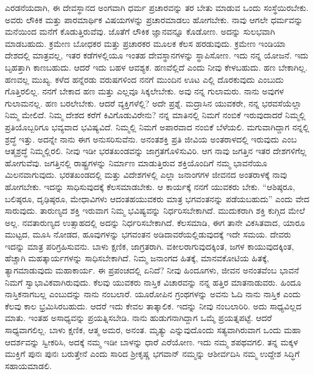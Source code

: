 ಎರಡನೆಯದಾಗಿ, ಈ ದೇವಸ್ಥಾನದ ಅಂಗವಾಗಿ ಧರ್ಮ ಪ್ರಚಾರವನ್ನು ತರ ಬೇತು ಮಾಡುವ ಒಂದು ಸಂಸ್ಥೆಯಿರಬೇಕು. ಅವರು ಲೌಕಿಕ ಮತ್ತು ಪಾರಮಾರ್ಥಿಕ ವಿಷಯಗಳನ್ನು ಪ್ರಚಾರಮಾಡಲು ಹೋಗಬೇಕು. ನಾವು ಆಗಲೇ ಧರ್ಮವನ್ನು ಮನೆಯಿಂದ ಮನೆಗೆ ಕೊಡುತ್ತಿರುವೆವು. ಜೊತೆಗೆ ಲೌಕಿಕ ಜ್ಞಾನವನ್ನೂ ಕೊಡೋಣ. ಅದನ್ನು ಸುಲಭವಾಗಿ ಮಾಡಬಹುದು. ಕ್ರಮೇಣ ಬೋಧಕರ ಮತ್ತು ಪ್ರಚಾರಕರ ಮೂಲಕ ಕೆಲಸ ಹರಡುವುದು. ಕ್ರಮೇಣ ಇಂಡಿಯಾ ದೇಶದಲ್ಲಿ ಮಾತ್ರವಲ್ಲ, ಇತರ ಕಡೆಗಳಲ್ಲಿಯೂ ಇಂತಹ ದೇವಸ್ಥಾನಗಳನ್ನು ಸ್ಥಾಪಿಸೋಣ. ಇದು ನನ್ನ ಯೋಜನೆ. ಇದು ಬೃಹತ್ತಾಗಿ ಕಾಣಬಹುದು. ಆದರೆ ಇದು ಬಹಳ ಆವಶ್ಯಕ. ಹಣವೆಲ್ಲಿದೆ ಎಂದು ನೀವು ಕೇಳಬಹುದು. ಹಣ ಬೇಕಾಗಿಲ್ಲ. ಹಣವಲ್ಲ ಮುಖ್ಯ. ಕಳೆದ ಹನ್ನೆರಡು ವರುಷಗಳಿಂದ ನನಗೆ ಮುಂದಿನ ಊಟ ಎಲ್ಲಿ ದೊರಕುವುದು ಎಂಬುದು ಗೊತ್ತಿರಲಿಲ್ಲ. ನನಗೆ ಬೇಕಾದ ಹಣ ಮತ್ತು ಎಲ್ಲವೂ ಸಿಕ್ಕಲೇಬೇಕು. ಅವು ನನ್ನ ಗುಲಾಮರು. ನಾನು ಅವುಗಳ ಗುಲಾಮನಲ್ಲ. ಹಣ ಬರಲೇಬೇಕು. ಆದರೆ ವ್ಯಕ್ತಿಗಳೆಲ್ಲಿ? ಅದೇ ಪ್ರಶ್ನೆ. ಮದ್ರಾಸಿನ ಯುವಕರೇ, ನನ್ನ ಭರವಸೆಯೆಲ್ಲಾ ನಿಮ್ಮ ಮೇಲಿದೆ. ನಿಮ್ಮ ದೇಶದ ಕರೆಗೆ ಕಿವಿಗೊಡುವಿರೇನು? ನನ್ನ ಮಾತಿನಲ್ಲಿ ನಿಮಗೆ ನಂಬಿಕೆ ಇರುವುದಾದರೆ ನಿಮ್ಮಲ್ಲಿ ಪ್ರತಿಯೊಬ್ಬರಿಗೂ ಭವ್ಯವಾದ ಭವಿಷ್ಯವಿದೆ. ನಿಮ್ಮಲ್ಲಿ ನಿಮಗೆ ಅಪಾರವಾದ ನಂಬಿಕೆ ಬೆಳೆಯಲಿ. ಮಗುವಾಗಿದ್ದಾಗ ನನ್ನಲ್ಲಿ ಶ್ರದ್ಧೆ ಇತ್ತು. ಅದನ್ನೇ ನಾನು ಈಗ ಅನುಸರಿಸುವೆನು. ಅನಂತಶಕ್ತಿ ಪ್ರತಿ ಜೀವಿಯ ಅಂತರಾಳದಲ್ಲಿ ಇರುವುದು ಎಂಬ ಆತ್ಮಶ್ರದ್ಧೆ ನಿಮ್ಮಲ್ಲಿರಲಿ. ನೀವು ಇಡೀ ಭರತಖಂಡವನ್ನು ಜಾಗ್ರತಗೊಳಿಸುವಿರಿ. ಆಗ ನಾವು ಜಗತ್ತಿನ ಇತರ ದೇಶಗಳಿಗೆಲ್ಲ ಹೋಗುವೆವು. ಜಗತ್ತಿನಲ್ಲಿ ರಾಷ್ಟ್ರಗಳನ್ನು ನಿರ್ಮಾಣ ಮಾಡುತ್ತಿರುವ ಶಕ್ತಿಯೊಂದಿಗೆ ನಮ್ಮ ಭಾವನೆಯೂ ಮಿಲನವಾಗುವುದು. ಭರತಖಂಡದಲ್ಲಿ ಮತ್ತು ವಿದೇಶಗಳಲ್ಲಿ ಎಲ್ಲಾ ಜನಾಂಗಗಳ ಜೀವನದ ಅಂತರಾಳಕ್ಕೆ ನಾವು ಹೋಗಬೇಕು. ಇದನ್ನು ಸಾಧಿಸುವುದಕ್ಕೆ ಕೆಲಸಮಾಡಬೇಕು. ಆ ಕಾರ್ಯಕ್ಕೆ ನನಗೆ ಯುವಕರು ಬೇಕು. “ಆಶಿಷ್ಠರೂ, ಬಲಿಷ್ಠರೂ, ದೃಢಿಷ್ಠರೂ, ಮೇಧಾವಿಗಳು ಆದಂತಹಯುವಕರು ಮಾತ್ರ ಭಗವಂತನನ್ನು ಪಡೆಯಬಹುದು” ಎಂದು ವೇದ ಸಾರುವುದು. ತಾರುಣ್ಯದ ಶಕ್ತಿ ಇರುವಾಗ ನಿಮ್ಮ ಭವಿಷ್ಯವನ್ನು ನಿರ್ಧರಿಸಬೇಕಾಗಿದೆ. ಮುದುಕರಾಗಿ ಶಕ್ತಿ ಕುಗ್ಗಿದ ಮೇಲೆ ಅಲ್ಲ. ನವತಾರುಣ್ಯದ ಉತ್ಸಾಹದಲ್ಲಿ ಅದನ್ನು ನಿರ್ಧರಿಸಬೇಕಾಗಿದೆ. ಕೆಲಸಮಾಡಿ, ಈಗ ತಾನೇ ವಿಕಸಿತವಾದ, ಯಾರೂ ಮುಟ್ಟದ, ಮೂಸಿ ನೋಡದ, ಹೂವುಗಳನ್ನು ಭಗವಂತನ ಅಡಿದಾವರೆಯಲ್ಲಿಡುವುದಕ್ಕೆ ಇದೇ ಸಮಯ. ದೇವರು ಇದನ್ನು ಮಾತ್ರ ಪರಿಗ್ರಹಿಸುವನು. ಬಾಳು ಕ್ಷಣಿಕ, ಜಾಗ್ರತರಾಗಿ. ವಕೀಲರಾಗುವುದಕ್ಕಿಂತ, ಜಗಳ ಕಾಯುವುದಕ್ಕಿಂತ, ಹೆಚ್ಚಾಗಿ ಮಹತ್ಕಾರ್ಯಗಳನ್ನು ಸಾಧಿಸಬೇಕಾಗಿದೆ. ನಿಮ್ಮ ಜನಾಂಗದ ಹಿತಕ್ಕೆ, ಮಾನವಕೋಟಿಯ ಹಿತಕ್ಕೆ, ತ್ಯಾಗಮಾಡುವುದು ಮಹಾಕಾರ್ಯ. ಈ ಪ್ರಪಂಚದಲ್ಲಿ ಏನಿದೆ? ನೀವು ಹಿಂದೂಗಳು, ಜೀವನ ಅನಂತವೆಂಬ ಭಾವನೆ ನಿಮಗೆ ಸ್ವಾಭಾವಿಕವಾಗಿರುವುದು. ಕೆಲವು ಯುವಕರು ನಾಸ್ತಿಕ ವಿಚಾರವನ್ನು ನನ್ನ ಹತ್ತಿರ ಮಾತನಾಡುವರು. ಹಿಂದೂ ನಾಸ್ತಿಕನಾಗಬಲ್ಲ ಎಂಬುದನ್ನು ನಾನು ನಂಬಲಾರೆ. ಯೂರೋಪಿನ ಗ್ರಂಥಗಳನ್ನು ಅವನು ಓದಿ ನಾನು ನಾಸ್ತಿಕ ಎಂದು ಕೆಲವು ಕಾಲ ಭ್ರಮಿಸಿರಬಹುದು. ಆದರೆ ಇದು ಕೇವಲ ತಾತ್ಕಾಲಿಕ. ಇದನ್ನು ನೀವು ನಂಬಲಾರಿರಿ. ಅದು ಸಾಧ್ಯವಿಲ್ಲದ ಮಾತು. ಇಂತಹ ಅಸಾಧ್ಯವನ್ನು ಪ್ರಯತ್ನಿಸಬೇಡಿ. ನಾನು ಹುಡುಗನಾಗಿದ್ದಾಗ ಒಮ್ಮೆ ಪ್ರಯತ್ನಪಟ್ಟೆ. ಆದರೆ ಸಾಧ್ಯವಾಗಲಿಲ್ಲ. ಬಾಳು ಕ್ಷಣಿಕ, ಆತ್ಮ ಅಮರ, ಅನಂತ. ಮೃತ್ಯು ಎನ್ನುವುದೊಂದು ಸತ್ಯವಾಗಿರುವಾಗ ಒಂದು ಮಹಾ ಆದರ್ಶವನ್ನು ಸ್ವೀಕರಿಸಿ, ಅದಕ್ಕೆ ನಮ್ಮ ಇಡೀ ಬಾಳನ್ನು ಧಾರೆ ಎರೆಯೋಣ. ಇದು ನಮ್ಮ ಶಪಥವಗಲಿ. ತನ್ನ ಮಕ್ಕಳ ಮುಕ್ತಿಗೆ ಪುನಃ ಪುನಃ ಬರುತ್ತೇನೆ ಎಂದು ಸಾರಿದ ಶ‍್ರೀಕೃಷ್ಣ ಭಗವಾನ್​ ನಮ್ಮನ್ನು ಆಶೀರ್ವದಿಸಿ ನಮ್ಮ ಉದ್ದೇಶ ಸಿದ್ಧಿಗೆ ಸಹಾಯಮಾಡಲಿ. 

